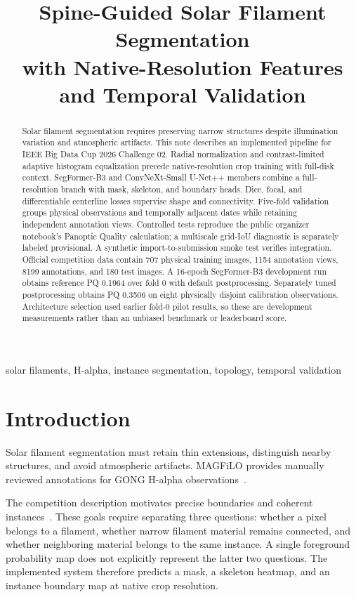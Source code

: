 \documentclass[conference]{IEEEtran}
\title{Spine-Guided Solar Filament Segmentation\\with Native-Resolution Features and Temporal Validation}
\author{\IEEEauthorblockN{Arjun Vijay Prakash}
\IEEEauthorblockA{Independent Researcher}}
\begin{document}
\maketitle
\begin{abstract}
Solar filament segmentation requires preserving narrow structures despite illumination variation and atmospheric artifacts. This note describes an implemented pipeline for IEEE Big Data Cup 2026 Challenge 02. Radial normalization and contrast-limited adaptive histogram equalization precede native-resolution crop training with full-disk context. SegFormer-B3 and ConvNeXt-Small U-Net++ members combine a full-resolution branch with mask, skeleton, and boundary heads. Dice, focal, and differentiable centerline losses supervise shape and connectivity. Five-fold validation groups physical observations and temporally adjacent dates while retaining independent annotation views. Controlled tests reproduce the public organizer notebook's Panoptic Quality calculation; a multiscale grid-IoU diagnostic is separately labeled provisional. A synthetic import-to-submission smoke test verifies integration. %
Official competition data contain 707 physical training images, 1154 annotation views, 8199 annotations, and 180 test images. A 16-epoch SegFormer-B3 development run obtains reference PQ 0.1964 over fold 0 with default postprocessing. Separately tuned postprocessing obtains PQ 0.3506 on eight physically disjoint calibration observations. Architecture selection used earlier fold-0 pilot results, so these are development measurements rather than an unbiased benchmark or leaderboard score.
\end{abstract}
\begin{IEEEkeywords}
solar filaments, H-alpha, instance segmentation, topology, temporal validation
\end{IEEEkeywords}

\section{Introduction}
Solar filament segmentation must retain thin extensions, distinguish nearby structures, and avoid atmospheric artifacts. MAGFiLO provides manually reviewed annotations for GONG H-alpha observations~\cite{magfilo}.

The competition description motivates precise boundaries and coherent instances~\cite{challenge}. These goals require separating three questions: whether a pixel belongs to a filament, whether narrow filament material remains connected, and whether neighboring material belongs to the same instance. A single foreground probability map does not explicitly represent the latter two questions. The implemented system therefore predicts a mask, a skeleton heatmap, and an instance boundary map at native crop resolution.
\end{document}
